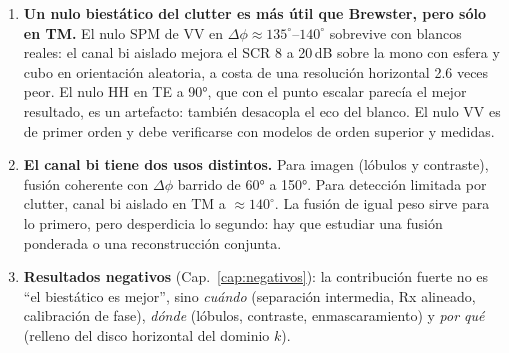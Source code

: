 \begin{enumerate}[itemsep=3pt]
  perfecto pero desaparece con 0.5°. El costo en imagen de la restricción es pequeño
  ($\pm12$\,\% en resoluciones).
  \item \textbf{Un nulo biestático del clutter es más útil que Brewster, pero sólo en TM.} El
  nulo SPM de VV en $\Delta\phi\approx135^{\circ}$--$140^{\circ}$ sobrevive con blancos reales: el canal
  bi aislado mejora el SCR 8 a 20\,dB sobre la mono con esfera y cubo en orientación aleatoria,
  a costa de una resolución horizontal 2.6 veces peor. El nulo HH en TE a 90°, que con el punto
  escalar parecía el mejor resultado, es un artefacto: también desacopla el eco del blanco. El
  nulo VV es de primer orden y debe verificarse con modelos de orden superior y medidas.
  \item \textbf{El canal bi tiene dos usos distintos.} Para imagen (lóbulos y contraste), fusión
  coherente con $\Delta\phi$ barrido de 60° a 150°. Para detección limitada por clutter, canal bi
  aislado en TM a $\approx140^{\circ}$. La fusión de igual peso sirve para lo primero, pero
  desperdicia lo segundo: hay que estudiar una fusión ponderada o una reconstrucción conjunta.
  \item \textbf{Resultados negativos} (Cap.~\ref{cap:negativos}): la contribución fuerte no es
  ``el biestático es mejor'', sino \emph{cuándo} (separación intermedia, Rx alineado,
  calibración de fase), \emph{dónde} (lóbulos, contraste, enmascaramiento) y \emph{por qué}
  (relleno del disco horizontal del dominio $k$).
\end{enumerate}

